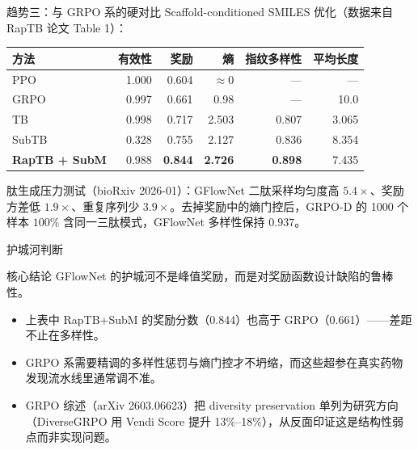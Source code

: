 \documentclass[aspectratio=169,10pt]{beamer}
\newcommand{\pos}[1]{\textcolor{positive}{#1}}
\newcommand{\con}[1]{\textcolor{negative}{#1}}
\newcommand{\HL}[1]{\textcolor{emphasis}{#1}}
\begin{document}
\begin{frame}{趋势三：与 GRPO 系的硬对比}
  Scaffold-conditioned SMILES 优化（数据来自 RapTB 论文 Table 1）：
  \vspace{4pt}
  \begin{center}
  \begin{tabular}{lrrrrr}
    \toprule
    方法 & 有效性 & 奖励 & 熵 & 指纹多样性 & 平均长度 \\
    \midrule
    PPO   & 1.000 & 0.604 & $\approx 0$ & --- & --- \\
    GRPO  & 0.997 & 0.661 & 0.98 & --- & 10.0 \\
    TB    & 0.998 & 0.717 & 2.503 & 0.807 & 3.065 \\
    SubTB & 0.328 & 0.755 & 2.127 & 0.836 & 8.354 \\
    \textbf{RapTB + SubM} & 0.988 & \textbf{0.844} & \textbf{2.726} & \textbf{0.898} & 7.435 \\
    \bottomrule
  \end{tabular}
  \end{center}

  \vspace{6pt}
  肽生成压力测试（bioRxiv 2026-01）：GFlowNet 二肽采样均匀度高 \pos{$5.4\times$}、奖励方差低 \pos{$1.9\times$}、重复序列少 \pos{$3.9\times$}。去掉奖励中的熵门控后，GRPO-D 的 1000 个样本 \con{$100\%$ 含同一三肽模式}，GFlowNet 多样性保持 $0.937$。
\end{frame}

\begin{frame}{护城河判断}
  \begin{exampleblock}{核心结论}
    GFlowNet 的护城河不是峰值奖励，而是\HL{对奖励函数设计缺陷的鲁棒性}。
  \end{exampleblock}

  \vspace{6pt}
  \begin{itemize}
    \item 上表中 RapTB+SubM 的奖励分数（0.844）也高于 GRPO（0.661）——差距不止在多样性。
    \item GRPO 系需要精调的多样性惩罚与熵门控才不坍缩，而这些超参在真实药物发现流水线里通常调不准。
    \item GRPO 综述（arXiv 2603.06623）把 diversity preservation 单列为研究方向（DiverseGRPO 用 Vendi Score 提升 13\%--18\%），从反面印证这是结构性弱点而非实现问题。
  \end{itemize}
\end{frame}
\end{document}
